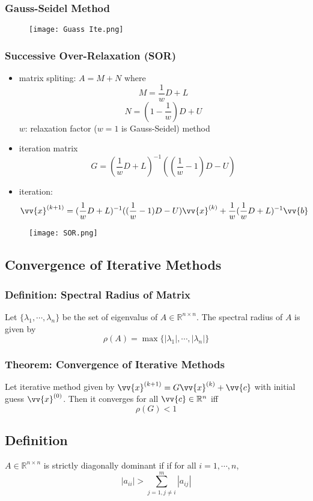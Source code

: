 \documentclass[11pt]{article}
\newcommand{\R}{{\mathbb{R}}}
\newcommand{\vb}{\vv{b}}
\newcommand{\vc}{\vv{c}}
\newcommand{\vx}{\vv{x}}
\begin{document}
\subsubsection{Gauss-Seidel Method}
\begin{figure}[tbhp]
	\begin{center}
		\texttt{[image: Guass Ite.png]}
	\end{center}
	\label{figcaption}
\end{figure}
\newpage
\subsubsection{Successive Over-Relaxation (SOR)}
\begin{itemize}
  \item matrix spliting: $A=M+N$ where \[M = \frac{1}{w}D+L\]\[N = (1 - \frac{1}{w})D+U\]
  $w$: relaxation factor ($w=1$ is Gauss-Seidel) method
  \item iteration matrix \[G = (\frac{1}{w}D+L)^{-1}((\frac{1}{w} - 1)D-U)\]
  \item iteration: \[\vx^{(k+1)} = (\frac{1}{w}D+L)^{-1}((\frac{1}{w} - 1)D-U)\vx^{(k)}+\frac{1}{w}(\frac{1}{w}D+L)^{-1}\vb\]
\end{itemize}
\begin{figure}[tbhp]
	\begin{center}
		\texttt{[image: SOR.png]}
	\end{center}
	\label{figcaption}
\end{figure}
\newpage
\subsection{Convergence of Iterative Methods}
\subsubsection{Definition: Spectral Radius of Matrix}
Let $\{\lambda_1, \cdots,\lambda_n\}$ be the set of eigenvalus of $A\in\R^{n\times n}$. The spectral radius of $A$ is given by
\[\rho(A) = \max\{|\lambda_1|,\cdots,|\lambda_n|\}\]
\subsubsection{Theorem: Convergence of Iterative Methods}
Let iterative method given by $\vx^{(k+1)}=G\vx^{(k)}+\vc$ with initial guess $\vx^{(0)}$. Then it converges for all $\vc\in\R^n$ iff \[\rho(G)<1\]
\subsection{Definition}
$A\in\R^{n\times n}$ is strictly diagonally dominant if if for all $i=1,\cdots,n$, \[|a_{ii}|>\sum_{j=1,j\neq i}^{m}|a_{ij}|\]
\end{document}
